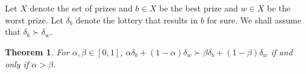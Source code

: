 \documentclass[12pt]{article}
\newtheorem{thm}{Theorem}[section]
\theoremstyle{definition}
\theoremstyle{remark}
\begin{document}
\maketitle
%
%

\section{}
%
%
Let $X$ denote the set of prizes and $b \in X$ be the best prize and $w \in X$ be the worst prize. Let $\delta_b$ denote the lottery that results in $b$ for sure. We shall assume that $\delta_b \succ \delta_w$.
\begin{thm}
  \label{vN-M1}
  For $\alpha, \beta \in [0,1]$, $\alpha \delta_b + (1 - \alpha) \delta_w \succ \beta \delta_b + (1 - \beta) \delta_w$ if and only if $\alpha > \beta$.
\end{thm}
\end{document}
